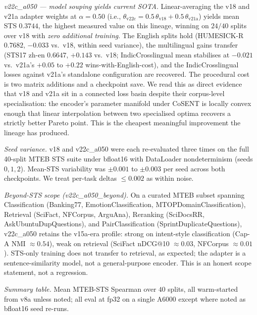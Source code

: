 \documentclass[
  11pt]{article}
\begin{document}
\emph{v22c\_a050 --- model souping yields current SOTA.}
Linear-averaging the v18 and v21a adapter weights at \(\alpha = 0.50\)
(i.e.,
\(\theta_{\text{v22c}} = 0.5\,\theta_{\text{v18}} + 0.5\,\theta_{\text{v21a}}\))
yields mean STS \(0.3744\), the highest measured value on this lineage,
winning on \(24/40\) splits over v18 with \emph{zero additional
training}. The English splits hold (HUMESICK-R \(0.7682\), \(-0.033\)
vs.~v18, within seed variance), the multilingual gains transfer (STS17
zh-en \(0.6647\), \(+0.143\) vs.~v18; IndicCrosslingual mean stabilises
at \(-0.021\) vs.~v21a's \(+0.05\) to \(+0.22\) wins-with-English-cost),
and the IndicCrosslingual losses against v21a's standalone configuration
are recovered. The procedural cost is two matrix additions and a
checkpoint save. We read this as direct evidence that v18 and v21a sit
in a connected loss basin despite their corpus-level specialisation: the
encoder's parameter manifold under CoSENT is locally convex enough that
linear interpolation between two specialised optima recovers a strictly
better Pareto point. This is the cheapest meaningful improvement the
lineage has produced.

\emph{Seed variance.} v18 and v22c\_a050 were each re-evaluated three
times on the full 40-split MTEB STS suite under bfloat16 with DataLoader
nondeterminism (seeds \(0, 1, 2\)). Mean-STS variability was
\(\pm 0.001\) to \(\pm 0.003\) per seed across both checkpoints. We
treat per-task deltas \(\leq 0.002\) as within noise.

\emph{Beyond-STS scope (v22c\_a050\_beyond).} On a curated MTEB subset
spanning Classification (Banking77, EmotionClassification,
MTOPDomainClassification), Retrieval (SciFact, NFCorpus, ArguAna),
Reranking (SciDocsRR, AskUbuntuDupQuestions), and PairClassification
(SprintDuplicateQuestions), v22c\_a050 retains the v15a-era profile:
strong on intent-style classification (Cap-A NMI \(\approx 0.54\)), weak
on retrieval (SciFact nDCG@10 \(\approx 0.03\), NFCorpus
\(\approx 0.01\)). STS-only training does not transfer to retrieval, as
expected; the adapter is a sentence-similarity model, not a
general-purpose encoder. This is an honest scope statement, not a
regression.

\emph{Summary table.} Mean MTEB-STS Spearman over \(40\) splits, all
warm-started from v8a unless noted; all eval at fp32 on a single A6000
except where noted as bfloat16 seed re-runs.
\end{document}
